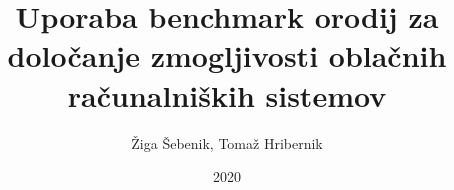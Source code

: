 \documentclass[slovene]{book}
\begin{document}
\hypersetup{pageanchor=false}

\author{Žiga Šebenik, Tomaž Hribernik}
\title{Uporaba benchmark orodij za določanje zmogljivosti oblačnih računalniških sistemov}
\date{2020}
\maketitle

\frontmatter
\tableofcontents


\mainmatter

 
% 

\backmatter
%
%
\end{document}
